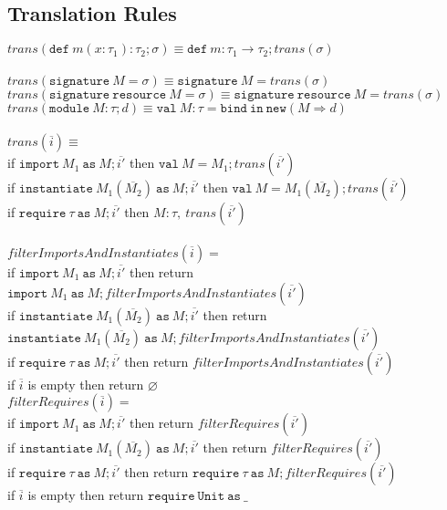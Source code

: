 \documentclass{llncs}
\newcommand{\keywadj}[1]{\mathtt{#1}}
\newcommand{\keyw}[1]{\keywadj{#1}~}
\begin{document}
\newpage

\subsection{Translation Rules}

$\textit{trans}(\keyw{def} m(x : \tau_1) : \tau_2; \sigma) \equiv \keyw{def} m : \tau_1 \rightarrow \tau_2; trans(\sigma)$\\
\\
$\textit{trans}(\keyw{signature} M = \sigma) \equiv \keyw{signature} M = trans(\sigma)$ \\
$\textit{trans}(\keyw{signature} \keyw{resource} M = \sigma) \equiv \keyw{signature} \keyw{resource} M = trans(\sigma)$ \\

\noindent$trans(\keyw{module} M : \tau; d) \equiv \keyw{val} M : \tau = \keyw{bind} \keyw{in} \keywadj{new}(M \Rightarrow d)$
\\\\
\noindent$\textit{trans}(\overline{i}) \equiv$\\
\indent if $\keyw{import} M_1~\keyw{as} M; \overline{i'}$ then $\keyw{val} M = M_1; trans(\overline{i'})$\\
\indent if $\keyw{instantiate} M_1(\overline{M_2})~\keyw{as} M; \overline{i'}$ then $ \keyw{val} M = M_1(\overline{M_2}); trans(\overline{i'})$\\
\indent if $\keyw{require} \tau~\keyw{as} M; \overline{i'}$ then $ M : \tau,~trans(\overline{i'})$\\
\\
$filterImportsAndInstantiates(\overline{i}) = $\\
\indent if $\keyw{import} M_1~\keyw{as} M; \overline{i'}$ then return $\keyw{import} M_1~\keyw{as} M; filterImportsAndInstantiates(\overline{i'})$\\
\indent if $\keyw{instantiate} M_1(\overline{M_2})~\keyw{as} M; \overline{i'}$ then return $\keyw{instantiate} M_1(\overline{M_2})~\keyw{as} M; filterImportsAndInstantiates(\overline{i'})$\\
\indent if $\keyw{require} \tau~\keyw{as} M; \overline{i'}$ then return $filterImportsAndInstantiates(\overline{i'})$\\
\indent if $\overline{i}$ is empty then return $\varnothing$ \\

\noindent$filterRequires(\overline{i}) = $\\
\indent if $\keyw{import} M_1~\keyw{as} M; \overline{i'}$ then return $filterRequires(\overline{i'})$\\
\indent if $\keyw{instantiate} M_1(\overline{M_2})~\keyw{as} M; \overline{i'}$ then return $filterRequires(\overline{i'})$\\
\indent if $\keyw{require} \tau~\keyw{as} M; \overline{i'}$ then return $\keyw{require} \tau~\keyw{as} M; filterRequires(\overline{i'})$\\
\indent if $\overline{i}$ is empty then return $\keyw{require} \keyw{Unit} \keyw{as} \_$ \\
\end{document}
